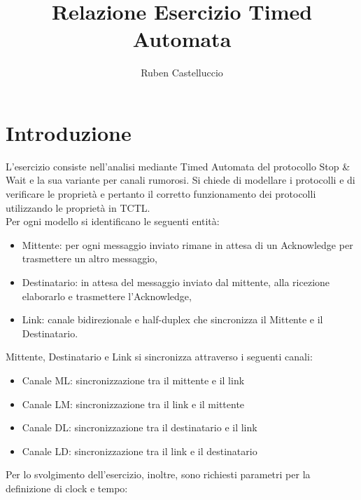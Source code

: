 \documentclass{article}
\title{Relazione Esercizio Timed Automata}
\author{Ruben Castelluccio}
\begin{document}
\maketitle

\section{Introduzione}
L'esercizio consiste nell'analisi mediante Timed Automata del protocollo Stop \& Wait e la sua variante per canali rumorosi. Si chiede di modellare i protocolli e di verificare le proprietà e pertanto il corretto funzionamento dei protocolli utilizzando le proprietà in TCTL.
\\Per ogni modello si identificano le seguenti entità:
\begin{itemize}
\item Mittente: per ogni messaggio inviato rimane in attesa di un Acknowledge per trasmettere un altro messaggio,
\item Destinatario: in attesa del messaggio inviato dal mittente, alla ricezione elaborarlo e trasmettere l'Acknowledge,
\item Link: canale bidirezionale e half-duplex che sincronizza il Mittente e il Destinatario.
\end{itemize}
Mittente, Destinatario e Link si sincronizza attraverso i seguenti canali:
\begin{itemize}
    \item Canale ML: sincronizzazione tra il mittente e il link
    \item Canale LM: sincronizzazione tra il link e il mittente
    \item Canale DL: sincronizzazione tra il destinatario e il link
    \item Canale LD: sincronizzazione tra il link e il destinatario
	\end{itemize}
Per lo svolgimento dell'esercizio, inoltre, sono richiesti parametri per la definizione di clock e tempo:
\end{document}
